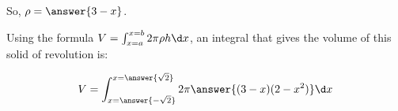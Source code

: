 \documentclass{ximera}
\begin{document}
\begin{exercise}
\begin{exercise}
\begin{exercise}
So, $\rho= \answer{3-x}$.




\begin{exercise}
Using the formula $V = \int_{x=a}^{x=b} 2 \pi \rho h \d x$, an integral that gives the volume of this solid of revolution is:

\[
V = \int_{x=\answer{-\sqrt{2}}}^{x=\answer{\sqrt{2}}} 2\pi \answer{(3-x)(2-x^2)} \d x
\]

\end{exercise}    
\end{exercise}
\end{exercise}
\end{exercise}
\end{document}
